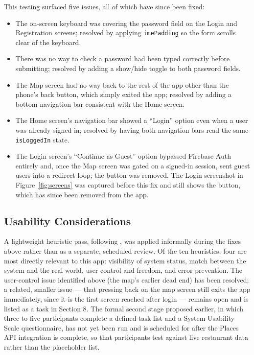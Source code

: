 \documentclass[12pt, a4paper]{article}
\begin{document}
This testing surfaced five issues, all of which have since been fixed:
\begin{itemize}
    \item The on-screen keyboard was covering the password field on the Login and Registration screens; resolved by applying \texttt{imePadding} so the form scrolls clear of the keyboard.
    \item There was no way to check a password had been typed correctly before submitting; resolved by adding a show/hide toggle to both password fields.
    \item The Map screen had no way back to the rest of the app other than the phone's back button, which simply exited the app; resolved by adding a bottom navigation bar consistent with the Home screen.
    \item The Home screen's navigation bar showed a ``Login'' option even when a user was already signed in; resolved by having both navigation bars read the same \texttt{isLoggedIn} state.
    \item The Login screen's ``Continue as Guest'' option bypassed Firebase Auth entirely and, once the Map screen was gated on a signed-in session, sent guest users into a redirect loop; the button was removed. The Login screenshot in Figure~\ref{fig:screens} was captured before this fix and still shows the button, which has since been removed from the app.
\end{itemize}

\subsection{Usability Considerations}

A lightweight heuristic pass, following \citet{nielsen1994}, was applied informally during the fixes above rather than as a separate, scheduled review. Of the ten heuristics, four are most directly relevant to this app: visibility of system status, match between the system and the real world, user control and freedom, and error prevention. The user-control issue identified above (the map's earlier dead end) has been resolved; a related, smaller issue — that pressing back on the map screen still exits the app immediately, since it is the first screen reached after login — remains open and is listed as a task in Section 8. The formal second stage proposed earlier, in which three to five participants complete a defined task list and a System Usability Scale questionnaire, has not yet been run and is scheduled for after the Places API integration is complete, so that participants test against live restaurant data rather than the placeholder list.
\end{document}

